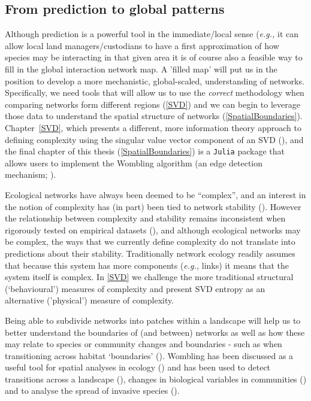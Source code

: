 \begin{refsection}
\subsection{From prediction to global patterns}

Although prediction is a powerful tool in the immediate/local sense 
(\emph{e.g.,} it can allow local land managers/custodians to have a 
first approximation of how species may be interacting in that given area it is of course also a feasible way to fill in the global interaction network map. A 'filled map' will put us in the position to develop a more mechanistic, global-scaled, understanding of networks. Specifically, we need tools that will allow us to use the \emph{correct} methodology when comparing networks form different regions (\autoref{SVD}) and we can begin to leverage those data to understand the spatial structure of networks (\autoref{SpatialBoundaries}). Chapter~\ref{SVD}, which presents a different, more information theory approach to defining complexity using the singular value vector component of an SVD (\cite{Shannon1948MatThe}), and the final chapter of this thesis (\autoref{SpatialBoundaries}) is a \texttt{Julia} package that allows users to implement the Wombling algorithm (an edge detection mechanism; \cite{Womble1951DifSys}).

Ecological networks have always been deemed to be ``complex'', and an interest in the notion of complexity has (in part) been tied to network stability (\cite{Landi2018Complexity}). However the relationship between complexity and stability remains inconsistent when rigorously tested on empirical datasets (\cite{Jacquet2016NoCom}), and although ecological networks may be complex, the ways that we currently define complexity do not translate into predictions about their stability. Traditionally network ecology readily assumes that because this system has more components (\emph{e.g.,} links) it means that the system itself is complex. In \autoref{SVD} we challenge the more traditional structural (`behavioural') measures of  complexity and present SVD entropy as an alternative ('physical') measure of complexity.

Being able to subdivide networks into patches within a landscape will help us to better understand the boundaries of (and between) networks as well as how these may relate to species or community changes and boundaries - such as when transitioning across habitat `boundaries' (\cite{Hackett2019ResOur}). Wombling has been discussed as a useful tool for spatial analyses in ecology (\cite{Fortin2005SpaAna}) and has been used to detect transitions across a landscape (\cite{Philibert2008SpaStr}), changes in biological variables in communities (\cite{Barbujani1989DetReg}) and to analyse the spread of invasive species (\cite{Fitzpatrick2010EcoBou}).


\end{refsection}
